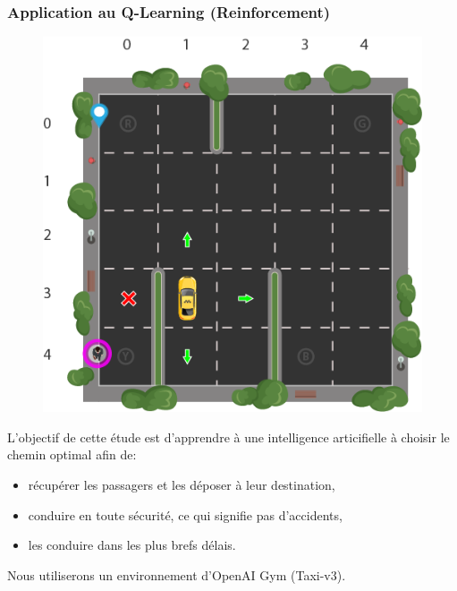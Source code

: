 \begin{frame}[fragile]
\frametitle{Application au Q-Learning (Reinforcement)}

\begin{figure}
\vspace{-0.5cm}
  \begin{center}
    \includegraphics[width=0.9\linewidth]{img/qlearning}
  \end{center}
\end{figure}

L'objectif de cette étude est d'apprendre à une intelligence articifielle à  choisir le chemin optimal afin de:
\begin{itemize}
 \item récupérer les passagers et les déposer à leur destination,
 \item conduire en toute sécurité, ce qui signifie pas d'accidents,
 \item les conduire dans les plus brefs délais.
\end{itemize}

Nous utiliserons un environnement d'OpenAI Gym (Taxi-v3).


\end{frame}
